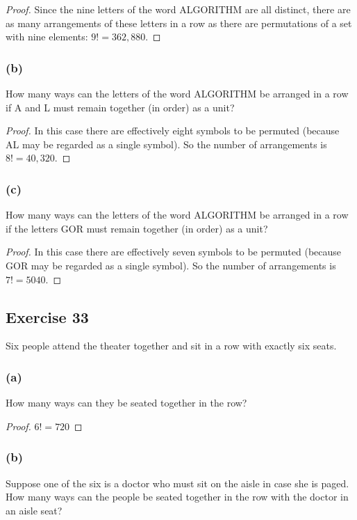 \documentclass[14pt]{extarticle}
\begin{document}
\begin{proof}
     Since the nine letters of the word ALGORITHM are all distinct, there are as many arrangements of these letters
     in a row as there are permutations of a set with nine elements: \(9! = 362,880\).
\end{proof}

\subsubsection{(b)}
How many ways can the letters of the word ALGORITHM be arranged in a row if A and L must remain together (in
order) as a unit?

\begin{proof}
     In this case there are effectively eight symbols to be permuted (because AL may be regarded as a single symbol).
     So the number of arrangements is \(8! = 40,320\).
\end{proof}

\subsubsection{(c)}
How many ways can the letters of the word ALGORITHM be arranged in a row if the letters GOR must remain together
(in order) as a unit?

\begin{proof}
     In this case there are effectively seven symbols to be permuted (because GOR may be regarded as a single symbol).
     So the number of arrangements is \(7! = 5040\).
\end{proof}

\subsection{Exercise 33}
Six people attend the theater together and sit in a row with exactly six seats.

\subsubsection{(a)}
How many ways can they be seated together in the row?

\begin{proof}
     \(6! = 720\)
\end{proof}

\subsubsection{(b)}
Suppose one of the six is a doctor who must sit on the aisle in case she is paged. How many ways can the people be
seated together in the row with the doctor in an aisle seat?
\end{document}
